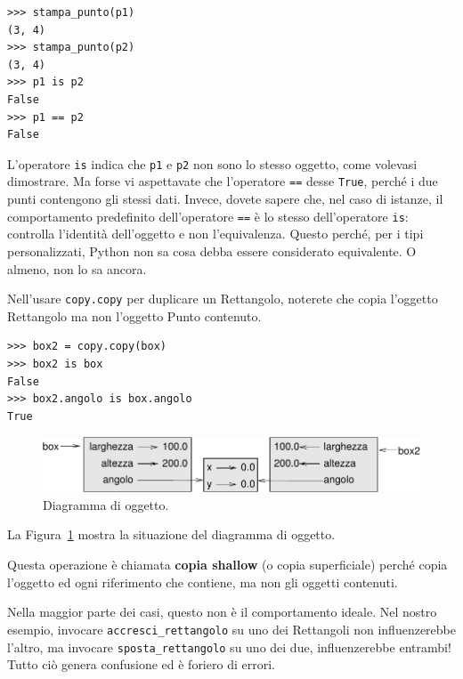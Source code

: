 \documentclass[10pt]{book}
\begin{document}
\begin{verbatim}
>>> stampa_punto(p1)
(3, 4)
>>> stampa_punto(p2)
(3, 4)
>>> p1 is p2
False
>>> p1 == p2
False
\end{verbatim}
%
L'operatore {\tt is} indica che {\tt p1} e {\tt p2} non sono lo stesso oggetto, come volevasi dimostrare. Ma forse vi aspettavate che l'operatore {\tt ==} desse {\tt True}, perché i due punti contengono gli stessi dati. Invece, dovete sapere che, nel caso di istanze, il comportamento predefinito dell'operatore {\tt ==} è lo stesso dell'operatore {\tt is}: controlla l'identità dell'oggetto e non l'equivalenza. Questo perché, per i tipi personalizzati, Python non sa cosa debba essere considerato equivalente. O almeno, non lo sa ancora.

Nell'usare {\tt copy.copy} per duplicare un Rettangolo, noterete che copia l'oggetto Rettangolo ma non l'oggetto Punto contenuto.

\begin{verbatim}
>>> box2 = copy.copy(box)
>>> box2 is box
False
>>> box2.angolo is box.angolo
True
\end{verbatim}

\begin{figure}
\centerline
{\includegraphics[scale=0.8]{figs/rectangle2.pdf}}
\caption{Diagramma di oggetto.}
\label{fig.rectangle2}
\end{figure}

La Figura~\ref{fig.rectangle2} mostra la situazione del diagramma di oggetto.

Questa operazione è chiamata {\bf copia shallow} (o copia superficiale) perché copia l'oggetto ed ogni riferimento che contiene, ma non gli oggetti contenuti.

Nella maggior parte dei casi, questo non è il comportamento ideale. Nel nostro esempio, invocare \verb"accresci_rettangolo" su uno dei Rettangoli non influenzerebbe l'altro, ma invocare \verb"sposta_rettangolo" su uno dei due, influenzerebbe entrambi! Tutto ciò genera confusione ed è foriero di errori.
\end{document}
